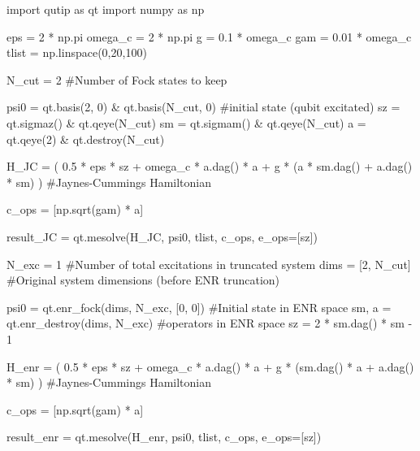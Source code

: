 import qutip as qt
import numpy as np

eps = 2 * np.pi
omega_c = 2 * np.pi
g = 0.1 * omega_c
gam = 0.01 * omega_c 
tlist = np.linspace(0,20,100)


N_cut = 2 #Number of Fock states to keep

psi0 = qt.basis(2, 0) & qt.basis(N_cut, 0) #initial state (qubit excitated)
sz = qt.sigmaz() & qt.qeye(N_cut)
sm = qt.sigmam() & qt.qeye(N_cut)
a = qt.qeye(2) & qt.destroy(N_cut)

H_JC = (
    0.5 * eps * sz + omega_c * a.dag() * a +
    g * (a * sm.dag() + a.dag() * sm)
) #Jaynes-Cummings Hamiltonian

c_ops = [np.sqrt(gam) * a]

result_JC = qt.mesolve(H_JC, psi0, tlist, c_ops, e_ops=[sz])


N_exc = 1 #Number of total excitations in truncated system
dims = [2, N_cut] #Original system dimensions (before ENR truncation)

psi0 = qt.enr_fock(dims, N_exc, [0, 0]) #Initial state in ENR space
sm, a = qt.enr_destroy(dims, N_exc) #operators in ENR space
sz = 2 * sm.dag() * sm - 1 

H_enr = (
    0.5 * eps * sz + omega_c * a.dag() * a +
    g * (sm.dag() * a + a.dag() * sm)
) #Jaynes-Cummings Hamiltonian

c_ops = [np.sqrt(gam) * a]

result_enr = qt.mesolve(H_enr, psi0, tlist, c_ops, e_ops=[sz]) 
    